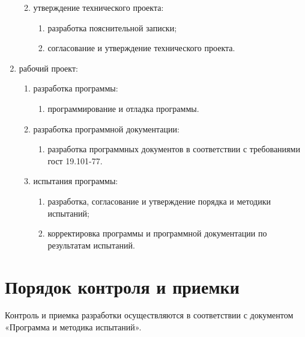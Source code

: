 \documentclass{../TechDoc}
\begin{document}
\begin{enumerate}
\begin{enumerate}
\begin{enumerate}
        \end{enumerate}
        \item утверждение технического проекта:
        \begin{enumerate}
            \item разработка пояснительной записки; 
            \item согласование и утверждение технического проекта. 
        \end{enumerate}
    \end{enumerate}
    \item рабочий проект:
    \begin{enumerate}
        \item разработка программы:
        \begin{enumerate}
            \item программирование и отладка программы. 
        \end{enumerate}
        \item разработка программной документации:
        \begin{enumerate}
            \item разработка программных документов в соответствии с требованиями гост 19.101-77. 
        \end{enumerate}
        \item испытания программы:
        \begin{enumerate}
            \item разработка, согласование и утверждение порядка и методики испытаний; 
            \item корректировка программы и программной документации по результатам испытаний.
        \end{enumerate}
    \end{enumerate}
    \end{enumerate}

    \section{Порядок контроля и приемки}
    
    Контроль и приемка разработки осуществляются в соответствии с документом «Программа и методика испытаний».
    
    \registrationList
        
\end{document}
